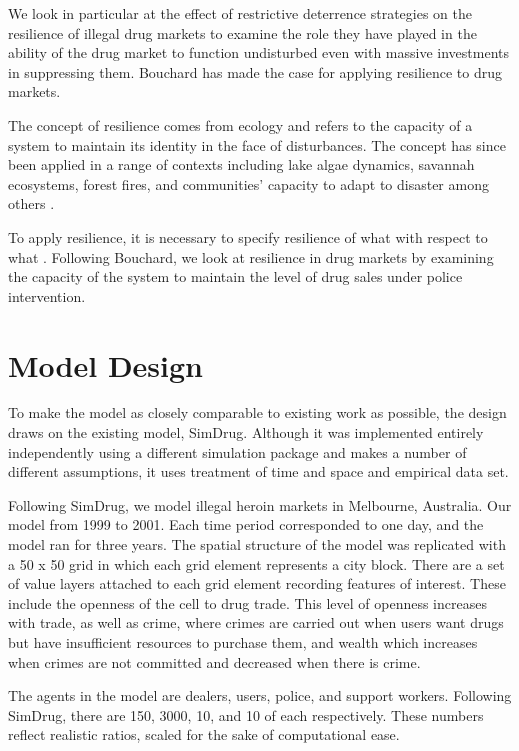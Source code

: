 \documentclass[runningheads,a4paper]{llncs}
\begin{document}
We look in particular at the effect of restrictive deterrence strategies on the resilience of illegal drug markets to examine the role they have played in the ability of the drug market to function undisturbed even with massive investments in suppressing them. Bouchard has made the case for applying resilience to drug markets.

The concept of resilience comes from ecology and refers to the capacity of a system to maintain its identity in the face of disturbances. The concept has since been applied in a range of contexts including lake algae dynamics, savannah ecosystems, forest fires, and communities' capacity to adapt to disaster among others \cite{The resilience alliance maintains a database of examples}. 

To apply resilience, it is necessary to specify resilience of what with respect to what \cite{Resilience of what with respect to what paper}.
Following Bouchard, we look at resilience in drug markets by examining the capacity of the system to maintain the level of drug sales under police intervention.


\section{Model Design}

To make the model as closely comparable to existing work as possible, the design draws on the existing model, SimDrug. Although it was implemented entirely independently using a different simulation package and makes a number of different assumptions, it uses treatment of time and space and empirical data set.

Following SimDrug, we model illegal heroin markets in Melbourne, Australia. Our model from 1999 to 2001. Each time period corresponded to one day, and the model ran for three years. The spatial structure of the model was replicated with a 50 x 50 grid in which each grid element represents a city block. There are a set of value layers attached to each grid element recording features of interest. These include the openness of the cell to drug trade. This level of openness increases with trade, as well as crime, where crimes are carried out when users want drugs but have insufficient resources to purchase them, and wealth which increases when crimes are not committed and decreased when there is crime. 

The agents in the model are dealers, users, police, and support workers. Following SimDrug, there are 150, 3000, 10, and 10 of each respectively. These numbers reflect realistic ratios, scaled for the sake of computational ease.
\end{document}
